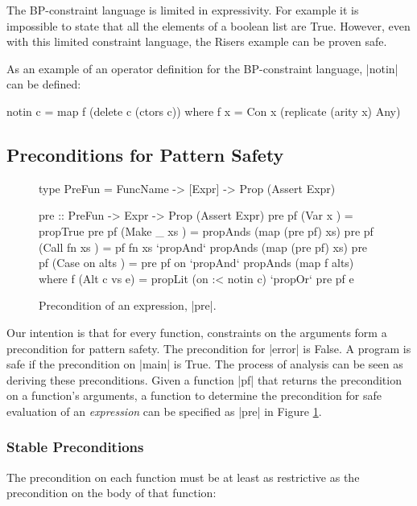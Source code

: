 The BP-constraint language is limited in expressivity. For example it is impossible to state that all the elements of a boolean list are True. However, even with this limited constraint language, the Risers example can be proven safe.

As an example of an operator definition for the BP-constraint language, |notin| can be defined:

\begin{code}
notin c = map f (delete c (ctors c))
   where f x = Con x (replicate (arity x) Any)
\end{code}


\subsection{Preconditions for Pattern Safety}
\label{sec:precond}

\begin{figure}
\begin{code}
type PreFun = FuncName -> [Expr] -> Prop (Assert Expr)

pre :: PreFun -> Expr -> Prop (Assert Expr)
pre pf (Var   x         ) = propTrue
pre pf (Make  _   xs    ) = propAnds (map (pre pf) xs)
pre pf (Call  fn  xs    ) = pf fn xs `propAnd` propAnds (map (pre pf) xs)
pre pf (Case  on  alts  ) = pre pf on `propAnd` propAnds (map f alts)
    where f (Alt c vs e) = propLit (on :< notin c) `propOr` pre pf e
\end{code}
\caption{Precondition of an expression, |pre|.}
\label{fig:precondition}
\figureend
\end{figure}

Our intention is that for every function, constraints on the arguments form a precondition for pattern safety. The precondition for |error| is False. A program is safe if the precondition on |main| is True. The process of analysis can be seen as deriving these preconditions. Given a function |pf| that returns the precondition on a function's arguments, a function to determine the precondition for safe evaluation of an \textit{expression} can be specified as |pre| in Figure \ref{fig:precondition}.

\subsubsection{Stable Preconditions}
\label{sec:fixp_precond}

The precondition on each function must be at least as restrictive as the precondition on the body of that function:

